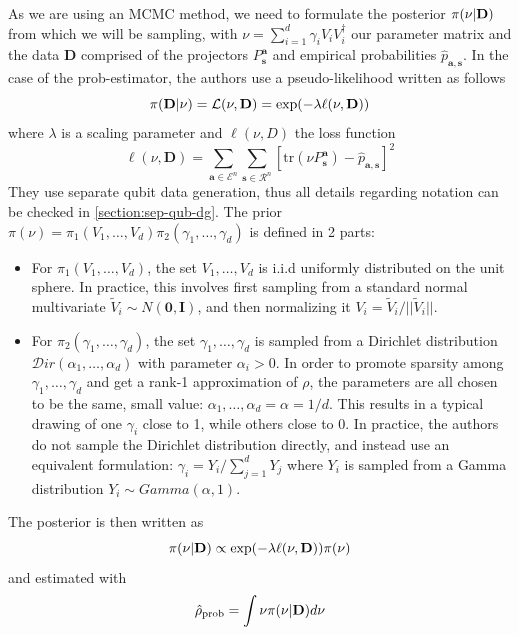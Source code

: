 \documentclass[12pt]{memoir}
\newcommand{\tr}{\text{tr}}
\newcommand{\mb}{\mathbf}
\newcommand{\tb}{\textbf}
\begin{document}
As we are using an MCMC method, we need to formulate the posterior $\pi(\nu | \tb D)$ from which we will be sampling, with $\nu = \sum_{i=1}^d \gamma_i V_i V_i^\dagger$ our parameter matrix and the data $\mb D$ comprised of the projectors $P^{\mb a}_{\mb s}$ and empirical probabilities $\hat p_{\mb a,\mb s}$. In the case of the prob-estimator, the authors use a pseudo-likelihood written as follows
\begin{equation}
    \pi(\tb D| \nu) = \mathcal{L}(\nu, \mb D) = \exp(-\lambda \ell(\nu,\mb D))
\end{equation}
where $\lambda$ is a scaling parameter and $\ell(\nu, D)$ the loss function
\begin{equation}
    \ell(\nu, \mb D) = \sum_{\mb a \in \mathcal{E}^n} \sum_{\mb s \in \mathcal{R}^n} \left[\tr(\nu P^{\mb a}_{\mb s}) - \hat p_{\mb a,\mb s}\right]^2
\end{equation}\medbreak
They use separate qubit data generation, thus all details regarding notation can be checked in \ref{section:sep-qub-dg}.
The prior $\pi(\nu) = \pi_1(V_1, \dots, V_d) \pi_2(\gamma_1, \dots, \gamma_d)$ is defined in 2 parts:
\begin{itemize}
    \item For $\pi_1(V_1, \dots, V_d)$, the set $V_1, \dots, V_d$ is i.i.d uniformly distributed on the unit sphere. In practice, this involves first sampling from a standard normal multivariate $\tilde V_i \sim N(\mb 0, \mb I)$, and then normalizing it $V_i = \tilde V_i/||\tilde V_i||$.
    \item For $\pi_2(\gamma_1, \dots, \gamma_d)$, the set $\gamma_1,\dots,\gamma_d$ is sampled from a Dirichlet distribution $\mathcal{D}ir(\alpha_1,\dots,\alpha_d)$ with parameter $\alpha_i > 0$. In order to promote sparsity among $\gamma_1, \dots, \gamma_d$ and get a rank-1 approximation of $\rho$, the parameters are all chosen to be the same, small value: $\alpha_1,\dots,\alpha_d = \alpha = 1/d$. This results in a typical drawing of one $\gamma_i$ close to 1, while others close to 0. In practice, the authors do not sample the Dirichlet distribution directly, and instead use an equivalent formulation: $\gamma_i = Y_i/\sum_{j=1}^{d} Y_j$ where $Y_i$ is sampled from a Gamma distribution $Y_i \sim Gamma(\alpha, 1)$.   
\end{itemize}
The posterior is then written as 
\begin{equation}
    \pi(\nu|\tb D) \propto \exp(-\lambda\ell(\nu, \mb D)) \pi(\nu)
\end{equation}
and estimated with 
\begin{equation}
    \hat \rho_{\text{prob}} = \int \nu \pi(\nu|\tb D) d\nu
\end{equation}
\end{document}
